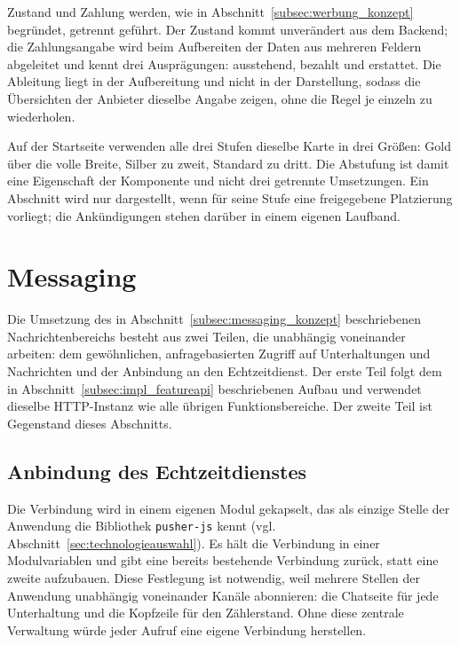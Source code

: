 Zustand und Zahlung werden, wie in
Abschnitt~\ref{subsec:werbung_konzept} begründet, getrennt geführt.
Der Zustand kommt unverändert aus dem Backend; die Zahlungsangabe
wird beim Aufbereiten der Daten aus mehreren Feldern abgeleitet und
kennt drei Ausprägungen: ausstehend, bezahlt und erstattet. Die
Ableitung liegt in der Aufbereitung und nicht in der Darstellung,
sodass die Übersichten der Anbieter dieselbe Angabe zeigen, ohne die
Regel je einzeln zu wiederholen.

Auf der Startseite verwenden alle drei Stufen dieselbe Karte in drei
Größen: Gold über die volle Breite, Silber zu zweit, Standard zu
dritt. Die Abstufung ist damit eine Eigenschaft der Komponente und
nicht drei getrennte Umsetzungen. Ein Abschnitt wird nur dargestellt,
wenn für seine Stufe eine freigegebene Platzierung vorliegt; die
Ankündigungen stehen darüber in einem eigenen Laufband.

\section{Messaging}
\label{sec:impl_messaging}

Die Umsetzung des in Abschnitt~\ref{subsec:messaging_konzept}
beschriebenen Nachrichtenbereichs besteht aus zwei Teilen, die
unabhängig voneinander arbeiten: dem gewöhnlichen, anfragebasierten
Zugriff auf Unterhaltungen und Nachrichten und der Anbindung an den
Echtzeitdienst. Der erste Teil folgt dem in
Abschnitt~\ref{subsec:impl_featureapi} beschriebenen Aufbau und
verwendet dieselbe \acs{HTTP}-Instanz wie alle übrigen
Funktionsbereiche. Der zweite Teil ist Gegenstand dieses Abschnitts.

\subsection{Anbindung des Echtzeitdienstes}
\label{subsec:impl_pusher_client}

Die Verbindung wird in einem eigenen Modul gekapselt, das als
einzige Stelle der Anwendung die Bibliothek \texttt{pusher-js}
kennt (vgl. Abschnitt~\ref{sec:technologieauswahl}). Es hält die
Verbindung in einer Modulvariablen und gibt eine bereits bestehende
Verbindung zurück, statt eine zweite aufzubauen. Diese Festlegung ist
notwendig, weil mehrere Stellen der Anwendung unabhängig voneinander
Kanäle abonnieren: die Chatseite für jede Unterhaltung und die
Kopfzeile für den Zählerstand. Ohne diese zentrale Verwaltung würde
jeder Aufruf eine eigene Verbindung herstellen.

